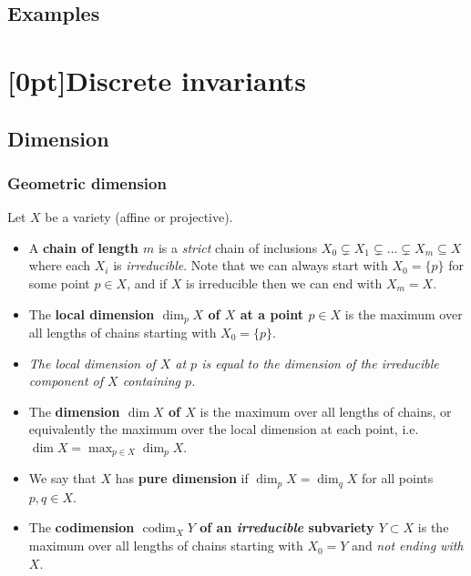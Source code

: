 \documentclass[10pt]{article}
\DeclareMathOperator{\codim}{codim}
\newcommand{\AG}{\textcolor{green}{AG}}
\begin{document}
        \subsection{Examples}


    \section{\protect\marginnote{\AG}[0pt]Discrete invariants}

        \subsection{Dimension}

            \subsubsection{Geometric dimension}

                Let $X$ be a variety (affine or projective).

                \begin{itemize}
                    \item A \textbf{chain of length $m$} is a \emph{strict} chain of inclusions $X_0\subsetneq X_1\subsetneq\ldots\subsetneq X_m\subseteq X$ where each $X_i$ is \emph{irreducible}.
                        Note that we can always start with $X_0=\{p\}$ for some point $p\in X$, and if $X$ is irreducible then we can end with $X_m=X$.
                    \item The \textbf{local dimension $\dim_p X$ of $X$ at a point $p\in X$} is the maximum over all lengths of chains starting with $X_0=\{p\}$.
                    \item \emph{The local dimension of $X$ at $p$ is equal to the dimension of the irreducible component of $X$ containing $p$.}
                    \item The \textbf{dimension $\dim X$ of $X$} is the maximum over all lengths of chains, or equivalently the maximum over the local dimension at each point, i.e. $\dim X=\max_{p\in X}\dim_p X$.
                    \item We say that $X$ has \textbf{pure dimension} if $\dim_p X=\dim_q X$ for all points $p,q\in X$.
                    \item The \textbf{codimension $\codim_X Y$ of an \emph{irreducible} subvariety $Y\subset X$} is the maximum over all lengths of chains starting with $X_0=Y$ and \emph{not ending with $X$}.
                \end{itemize}
\end{document}
